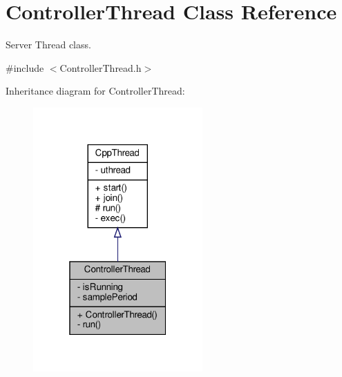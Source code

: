 \hypertarget{classControllerThread}{}\section{Controller\+Thread Class Reference}
\label{classControllerThread}


Server Thread class.  




{\ttfamily \#include $<$Controller\+Thread.\+h$>$}



Inheritance diagram for Controller\+Thread\+:\nopagebreak
\begin{figure}[H]
\begin{center}
\leavevmode
\includegraphics[width=184pt]{classControllerThread__inherit__graph}
\end{center}
\end{figure}


